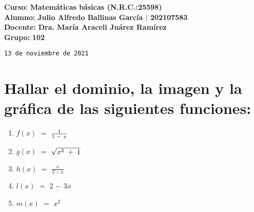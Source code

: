 \documentclass[12pt]{article}
\newenvironment{MyColorPar}[1]{%
    \leavevmode\color{#1}\ignorespaces%
}{%
}%
\begin{document}
    \large{\bf{\textsf{Curso:}}} {\bfseries{{\textcolor{brightturquoise}{Matemáticas básicas \bfseries{(N.R.C.:25598)}}}}} \\
    \large{\bf{\textsf{Alumno:}}} {\bfseries{{\textcolor{prussianblue}{Julio Alfredo Ballinas García {\large{{$\mid$}}} 202107583}}}}  \\
    \large{\bf{\textsf{Docente:}}} {\bfseries{{\textcolor{wisteria}{Dra. María Araceli Juárez Ramírez}}}}\\
    \large{\bf{\textsf{Grupo:}}} {\bfseries{{\textcolor{verde_manzana}{102}}}}\\

\vfill
    
\begin{center} 

    {\texttt{13 de noviembre de 2021}}
    
\end{center}

\newpage

\section*{{\textsf{Hallar el dominio, la imagen y la gráfica de las siguientes funciones:}}}

\begin{enumerate}[label=\alph*)]
    \item \begin{MyColorPar}{Lochinvar} 
    $f(x)$ $=$ \LARGE{$\frac{1}{1 \hspace{0.1cm} - \hspace{0.1cm} x }$}
    \end{MyColorPar}
    \vspace{0.5cm}
    
    \item \begin{MyColorPar}{Cinnabar} 
    $g(x)$ $=$ $\sqrt{x^{2} \hspace{0.1cm} + \hspace{0.1cm} 1 }$
    \end{MyColorPar}
    \vspace{0.5cm}
    
    \item \begin{MyColorPar}{darkmagenta} 
   $h(x)$ $=$ {\LARGE{$\frac{x}{2-x}$}}
    \end{MyColorPar}
    \vspace{0.5cm}
    
    \item \begin{MyColorPar}{carrotorange} 
   $l(x)$ $=$ $2$ $-$ $3x$
    \end{MyColorPar}
    \vspace{0.5cm}
    
    \item \begin{MyColorPar}{verde_manzana} 
   $m(x)$ $=$ $x^{2}$ 
    \end{MyColorPar}
    \vspace{0.5cm}
\end{enumerate} \vspace{0.5cm}
\end{document}
